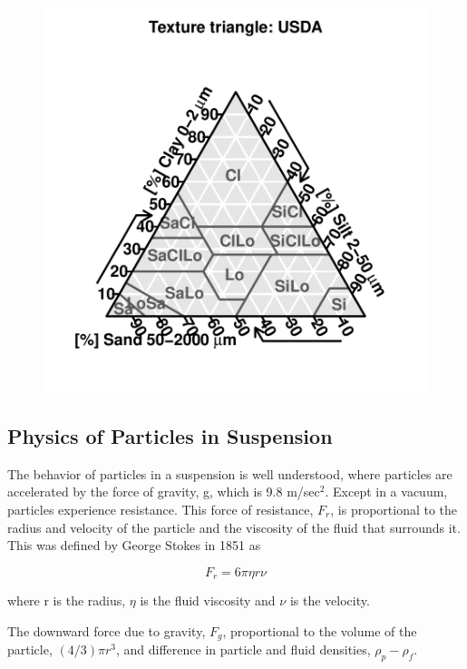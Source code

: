 \documentclass{tufte-handout}
\begin{document}
\begin{figure}
\includegraphics{Particle_Size_Analysis-USDATT}
\end{figure}

\subsection{Physics of Particles in Suspension}

The behavior of particles in a suspension is well understood, where particles are accelerated by the force of gravity, g, which is 9.8 m/sec$^2$. Except in a vacuum, particles experience resistance. This force of resistance, $F_r$, is proportional to the radius and velocity of the particle and the viscosity of the fluid that surrounds it. This was defined by George Stokes in 1851 as

\begin{equation}\label{eq:Fr}
F_r = 6\pi \eta r \nu
\end{equation}

\noindent where r is the radius, 
$\eta$ is the fluid viscosity and 
$\nu$ is the velocity.

The downward force due to gravity, $F_g$, proportional to the volume of the particle, $(4/3)\pi r^3$, and difference in particle and fluid densities, $\rho_p - \rho_f$.
\end{document}
